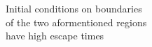 \documentclass[preview]{standalone}
\begin{document}
Initial conditions on boundaries\\of the two aformentioned regions\\have high escape times\\
\end{document}

